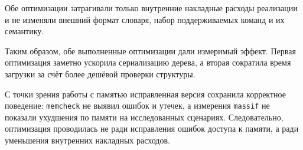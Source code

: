 Обе оптимизации затрагивали только внутренние накладные расходы реализации и не изменяли внешний формат словаря, набор поддерживаемых команд и их семантику.

Таким образом, обе выполненные оптимизации дали измеримый эффект. Первая оптимизация заметно ускорила сериализацию дерева, а вторая сократила время загрузки за счёт более дешёвой проверки структуры.

С точки зрения работы с памятью исправленная версия сохранила корректное поведение: \texttt{memcheck} не выявил ошибок и утечек, а измерения \texttt{massif} не показали ухудшения по памяти на исследованных сценариях. Следовательно, оптимизация проводилась не ради исправления ошибок доступа к памяти, а ради уменьшения внутренних накладных расходов.

\pagebreak
